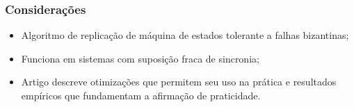 \documentclass{beamer}
\begin{document}
\begin{frame}
  \frametitle{Considerações}
  
  \begin{itemize}
    \item
      Algoritmo de replicação de máquina de estados tolerante a falhas bizantinas;

      \pause
    \item
      Funciona em sistemas com suposição fraca de sincronia;

      \pause
    \item
      Artigo descreve otimizações que permitem seu uso na prática e resultados empíricos que fundamentam a afirmação de praticidade.
  \end{itemize}
\end{frame}
\end{document}

